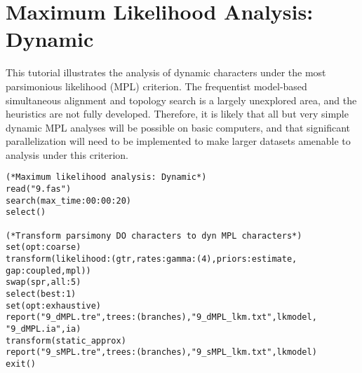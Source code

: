 
\section{Maximum Likelihood Analysis: Dynamic}{\label{tutorial15}}
This tutorial illustrates the analysis of dynamic characters under the most parsimonious likelihood 
(MPL) criterion. The frequentist model-based simultaneous alignment and topology search is a 
largely unexplored area, and the heuristics are not fully developed. Therefore, it is likely that all but 
very simple dynamic MPL analyses will be possible on basic computers, and that significant 
parallelization will need to be implemented to make larger datasets amenable to analysis under this 
criterion.

\begin{verbatim}
(*Maximum likelihood analysis: Dynamic*)
read("9.fas")
search(max_time:00:00:20)
select()

(*Transform parsimony DO characters to dyn MPL characters*)
set(opt:coarse)
transform(likelihood:(gtr,rates:gamma:(4),priors:estimate, 
gap:coupled,mpl))
swap(spr,all:5)
select(best:1)
set(opt:exhaustive)
report("9_dMPL.tre",trees:(branches),"9_dMPL_lkm.txt",lkmodel,
"9_dMPL.ia",ia)
transform(static_approx)
report("9_sMPL.tre",trees:(branches),"9_sMPL_lkm.txt",lkmodel)
exit()
\end{verbatim}

